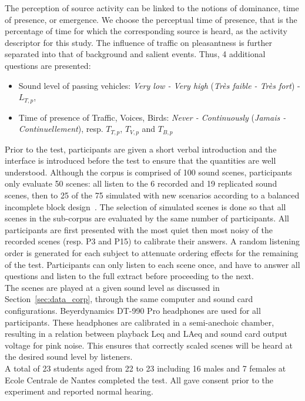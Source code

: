 \documentclass[11pt,a4paper]{article}
\begin{document}
The perception of source activity can be linked to the notions of dominance, time of presence, or emergence. We choose the perceptual time of presence, that is the percentage of time for which the corresponding source is heard, as the activity descriptor for this study. The influence of traffic on pleasantness is further separated into that of background and salient events. Thus, 4 additional questions are presented:
\begin{itemize}
\item Sound level of passing vehicles: \textit{Very low - Very high} (\textit{Tr\`es faible - Tr\`es fort}) - $L_{T, p}$,
\item Time of presence of Traffic, Voices, Birds: \textit{Never - Continuously} (\textit{Jamais - Continuellement}), resp. $T_{T, p}$, $T_{V, p}$ and $T_{B, p}$
\end{itemize}

Prior to the test, participants are given a short verbal introduction and the interface is introduced before the test to ensure that the quantities are well understood. Although the corpus is comprised of 100 sound scenes, participants only evaluate 50 scenes: all listen to the 6 recorded and 19 replicated sound scenes, then to 25 of the 75 simulated with new scenarios according to a balanced incomplete block design~\cite{dagnelie2003}. The selection of simulated scenes is done so that all scenes in the sub-corpus are evaluated by the same number of participants. All participants are first presented with the most quiet then most noisy of the recorded scenes (resp. P3 and P15) to calibrate their answers. A random listening order is generated for each subject to attenuate ordering effects for the remaining of the test. Participants can only listen to each scene once, and have to answer all questions and listen to the full extract before proceeding to the next.\\

The scenes are played at a given sound level as discussed in Section~\ref{sec:data_corp}, through the same computer and sound card configurations. Beyerdynamics DT-990 Pro headphones are used for all participants. These headphones are calibrated in a semi-anechoic chamber, resulting in a relation between playback Leq and LAeq and sound card output voltage for pink noise. This ensures that correctly scaled scenes will be heard at the desired sound level by listeners.\\

A total of 23 students aged from 22 to 23 including 16 males and 7 females at Ecole Centrale de Nantes completed the test. All gave consent prior to the experiment and reported normal hearing.
\end{document}
